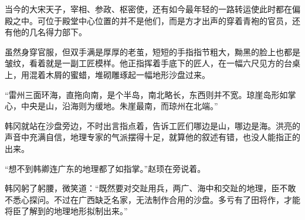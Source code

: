 当今的大宋天子，宰相、参政、枢密使，还有如今最年轻的一路转运使此时都在偏殿之中。可位于殿堂中心位置的并不是他们，而是方才出声的穿着青袍的官员，还有他的几名得力部下。

虽然身穿官服，但双手满是厚厚的老茧，短短的手指指节粗大，黝黑的脸上也都是皱纹，看着就是一副工匠模样。他正指挥着手底下的匠人，在一幅六尺见方的台桌上，用混着木屑的蜜蜡，堆砌雕琢起一幅地形沙盘过来。

“雷州三面环海，直拖向南，是个半岛，南北略长，东西则并不宽。琼崖岛形如掌心，中央是山，沿海则为缓地。朱崖最南，而琼州在北端。”

韩冈就站在沙盘旁边，不时出言指点着，告诉工匠们哪边是山，哪边是海。洪亮的声音中充满自信，地理专家的气派摆得十足，就算他的叙述有错，也没人能指正的出来。

“想不到韩卿连广东的地理都了如指掌。”赵顼在旁说着。

韩冈躬了躬腰，微笑道：“既然要对交趾用兵，两广、海中和交趾的地理，臣不敢不悉心探问。不过在广西缺乏名家，无法制作合用的沙盘。多亏有了田将作，才能将臣了解到的地理地形拟制出来。”

